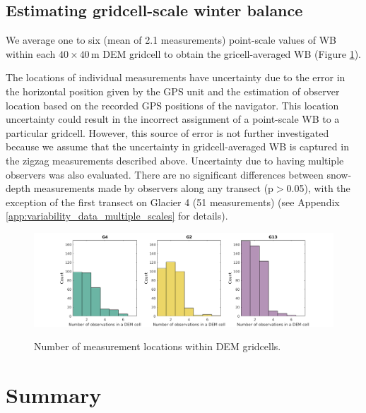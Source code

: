 \documentclass{sfuthesis}
\begin{document}
\subsection{Estimating gridcell-scale winter balance}

We average one to six (mean of 2.1 measurements) point-scale values of WB within each $40 \times 40$\,m DEM gridcell to obtain the gricell-averaged WB (Figure \ref{fig:NumObsPerCell}).
{\color{red}{Approximately 12\% of the gridcells on Glacier 4 have at least one measurement, while $\sim$8\% and $\sim$6\% of the gridcells have measurements on Glaciers 2 and 13, respectively.} The locations of individual measurements have uncertainty due to the error in the horizontal position given by the GPS unit and the estimation of observer location based on the recorded GPS positions of the navigator. This location uncertainty could result in the incorrect assignment of a point-scale WB to a particular gridcell. However, this source of error is not further investigated because we assume that the uncertainty in gridcell-averaged WB is captured in the zigzag measurements described above. Uncertainty due to having multiple observers was also evaluated. There are no significant differences between snow-depth measurements made by observers along any transect (p$>$0.05), with the exception of the first transect on Glacier 4 (51 measurements) (see Appendix \ref{app:variability_data_multiple_scales} for details). 

\begin{figure}[H]
	\centering
	\includegraphics[width =\textwidth]{NumObsPerCell.png}\\
	\caption{Number of measurement locations within DEM gridcells.}
	\label{fig:NumObsPerCell}
\end{figure}


\section{Summary}

}
\end{document}
